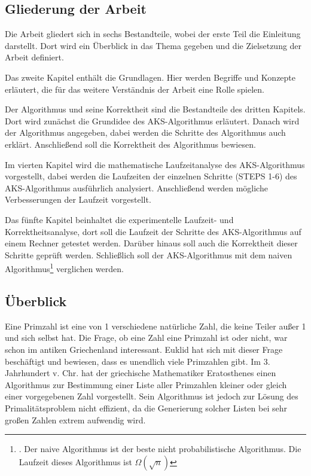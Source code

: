 \documentclass[12pt,oneside]{article}
\theoremstyle{remark}
\theoremstyle{definition}
\begin{document}
\subsection{Gliederung der Arbeit}
Die Arbeit gliedert sich in sechs Bestandteile, wobei der
erste Teil die Einleitung darstellt. Dort wird ein Überblick in das Thema gegeben und die Zielsetzung der Arbeit definiert.

Das zweite Kapitel enthält die Grundlagen. Hier werden Begriffe und Konzepte erläutert, die für das weitere Verständnis der Arbeit eine Rolle spielen. 

Der Algorithmus und seine Korrektheit sind die Bestandteile des dritten Kapitels. Dort wird zunächst die Grundidee des AKS-Algorithmus erläutert. Danach wird der Algorithmus angegeben, dabei werden die Schritte des Algorithmus auch erklärt. Anschließend soll die Korrektheit des Algorithmus bewiesen. 

Im vierten Kapitel wird die mathematische Laufzeitanalyse des AKS-Algorithmus vorgestellt, dabei werden die Laufzeiten der einzelnen Schritte (STEPS 1-6) des AKS-Algorithmus ausführlich analysiert. Anschließend werden mögliche Verbesserungen der Laufzeit vorgestellt. 

Das fünfte Kapitel beinhaltet die experimentelle Laufzeit- und Korrektheitsanalyse, dort  soll die Laufzeit der Schritte des AKS-Algorithmus auf einem Rechner getestet werden. Darüber hinaus soll auch die Korrektheit dieser Schritte geprüft werden. Schließlich soll der AKS-Algorithmus mit dem naiven Algorithmus\footnote{. Der naive Algorithmus ist der beste nicht probabilistische Algorithmus. Die Laufzeit dieses Algorithmus ist $\Omega(\sqrt{n})$} verglichen werden.


\subsection{Überblick}
Eine Primzahl ist eine von 1 verschiedene natürliche Zahl, die keine Teiler außer 1 und sich selbst hat. Die Frage, ob eine Zahl eine Primzahl ist oder nicht, war schon im antiken Griechenland interessant. Euklid hat sich mit dieser Frage beschäftigt und bewiesen, dass es unendlich viele Primzahlen gibt. Im 3. Jahrhundert v. Chr. hat der griechische Mathematiker Eratosthenes einen Algorithmus zur Bestimmung einer Liste aller Primzahlen kleiner oder gleich einer vorgegebenen Zahl vorgestellt. Sein Algorithmus ist jedoch zur Lösung des Primalitätsproblem nicht effizient, da die Generierung solcher Listen bei sehr großen Zahlen extrem aufwendig wird.
\end{document}

